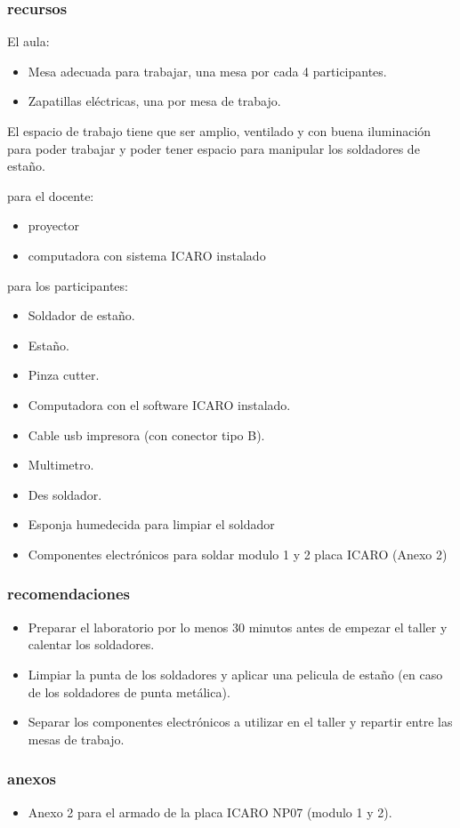 \subsubsection{recursos}
El aula:
\begin{itemize}
  \item Mesa adecuada para trabajar, una mesa por cada 4 participantes.
  \item Zapatillas eléctricas, una por mesa de trabajo.
\end{itemize}
El espacio de trabajo tiene que ser amplio, ventilado y con buena iluminación para poder trabajar y poder tener espacio para manipular los soldadores de estaño.    

para el docente:
\begin{itemize}
  \item proyector
  \item computadora con sistema ICARO instalado
\end{itemize}
para los participantes:
\begin{itemize}
  \item Soldador de estaño.
  \item Estaño.
  \item Pinza cutter.
  \item Computadora con el software ICARO instalado.
  \item Cable usb impresora (con conector tipo B).
  \item Multimetro.
  \item Des soldador.
  \item Esponja humedecida para limpiar el soldador
  \item Componentes electrónicos para soldar modulo 1 y 2 placa ICARO (Anexo 2) 
\end{itemize}

\subsubsection{recomendaciones}

\begin{itemize}
  \item Preparar el laboratorio por lo menos 30 minutos antes de empezar el taller y calentar los soldadores.

  \item Limpiar la punta de los soldadores y aplicar una pelicula de estaño (en caso de los soldadores de punta metálica).

  \item Separar los componentes electrónicos a utilizar en el taller y repartir entre las mesas de trabajo.

\end{itemize}
\subsubsection{anexos}
\begin{itemize}
  \item Anexo 2 para el armado de la placa ICARO NP07 (modulo 1 y 2).
\end{itemize}

